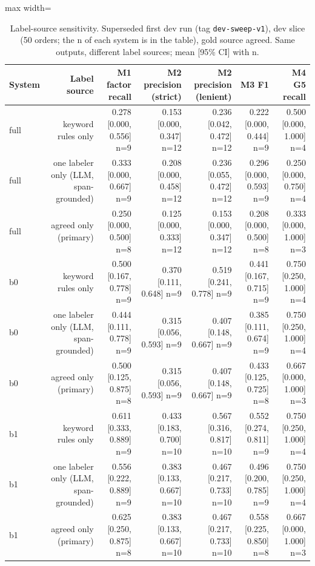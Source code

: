 \begin{table}[t]
\centering
\small
\caption{Label-source sensitivity. Superseded first dev run (tag \texttt{dev-sweep-v1}), dev slice (50 orders; the n of each system is in the table), gold source agreed. Same outputs, different label sources; mean [95\% CI] with n.}
\label{tab:table_label_sensitivity}
\begin{adjustbox}{max width=\textwidth}
\begin{tabular}{lrrrrrr}
\toprule
System & Label source & M1 factor recall & M2 precision (strict) & M2 precision (lenient) & M3 F1 & M4 G5 recall \\
\midrule
full & keyword rules only & 0.278 [0.000, 0.556] n=9 & 0.153 [0.000, 0.347] n=12 & 0.236 [0.042, 0.472] n=12 & 0.222 [0.000, 0.444] n=9 & 0.500 [0.000, 1.000] n=4 \\
full & one labeler only (LLM, span-grounded) & 0.333 [0.000, 0.667] n=9 & 0.208 [0.000, 0.458] n=12 & 0.236 [0.055, 0.472] n=12 & 0.296 [0.000, 0.593] n=9 & 0.250 [0.000, 0.750] n=4 \\
full & agreed only (primary) & 0.250 [0.000, 0.500] n=8 & 0.125 [0.000, 0.333] n=12 & 0.153 [0.000, 0.347] n=12 & 0.208 [0.000, 0.500] n=8 & 0.333 [0.000, 1.000] n=3 \\
b0 & keyword rules only & 0.500 [0.167, 0.778] n=9 & 0.370 [0.111, 0.648] n=9 & 0.519 [0.241, 0.778] n=9 & 0.441 [0.167, 0.715] n=9 & 0.750 [0.250, 1.000] n=4 \\
b0 & one labeler only (LLM, span-grounded) & 0.444 [0.111, 0.778] n=9 & 0.315 [0.056, 0.593] n=9 & 0.407 [0.148, 0.667] n=9 & 0.385 [0.111, 0.674] n=9 & 0.750 [0.250, 1.000] n=4 \\
b0 & agreed only (primary) & 0.500 [0.125, 0.875] n=8 & 0.315 [0.056, 0.593] n=9 & 0.407 [0.148, 0.667] n=9 & 0.433 [0.125, 0.725] n=8 & 0.667 [0.000, 1.000] n=3 \\
b1 & keyword rules only & 0.611 [0.333, 0.889] n=9 & 0.433 [0.183, 0.700] n=10 & 0.567 [0.316, 0.817] n=10 & 0.552 [0.274, 0.811] n=9 & 0.750 [0.250, 1.000] n=4 \\
b1 & one labeler only (LLM, span-grounded) & 0.556 [0.222, 0.889] n=9 & 0.383 [0.133, 0.667] n=10 & 0.467 [0.217, 0.733] n=10 & 0.496 [0.200, 0.785] n=9 & 0.750 [0.250, 1.000] n=4 \\
b1 & agreed only (primary) & 0.625 [0.250, 0.875] n=8 & 0.383 [0.133, 0.667] n=10 & 0.467 [0.217, 0.733] n=10 & 0.558 [0.225, 0.850] n=8 & 0.667 [0.000, 1.000] n=3 \\

\end{tabular}
\end{adjustbox}
\end{table}
